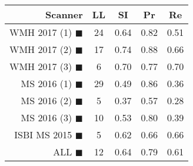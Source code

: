 \begin{tabular}{rcccc}
\toprule
Scanner & LL & SI & Pr & Re \\
\midrule
WMH 2017 (1) {\color[rgb]{ 1.00 0.00 0.00}$\blacksquare$} & 24 & 0.64 & 0.82 & 0.51 \\
WMH 2017 (2) {\color[rgb]{ 1.00 0.50 0.00}$\blacksquare$} & 17 & 0.74 & 0.88 & 0.66 \\
WMH 2017 (3) {\color[rgb]{ 1.00 0.80 0.00}$\blacksquare$} & 6 & 0.70 & 0.77 & 0.70 \\
MS  2016 (1) {\color[rgb]{ 0.20 0.80 0.00}$\blacksquare$} & 29 & 0.49 & 0.86 & 0.36 \\
MS  2016 (2) {\color[rgb]{ 0.00 0.40 1.00}$\blacksquare$} & 5 & 0.37 & 0.57 & 0.28 \\
MS  2016 (3) {\color[rgb]{ 0.60 0.00 1.00}$\blacksquare$} & 10 & 0.53 & 0.80 & 0.39 \\
ISBI MS 2015 {\color[rgb]{ 1.00 0.00 1.00}$\blacksquare$} & 5 & 0.62 & 0.66 & 0.66 \\
\midrule
ALL {\color[rgb]{ 1.00 1.00 1.00}$\blacksquare$} & 12 & 0.64 & 0.79 & 0.61 \\
\bottomrule
\end{tabular}